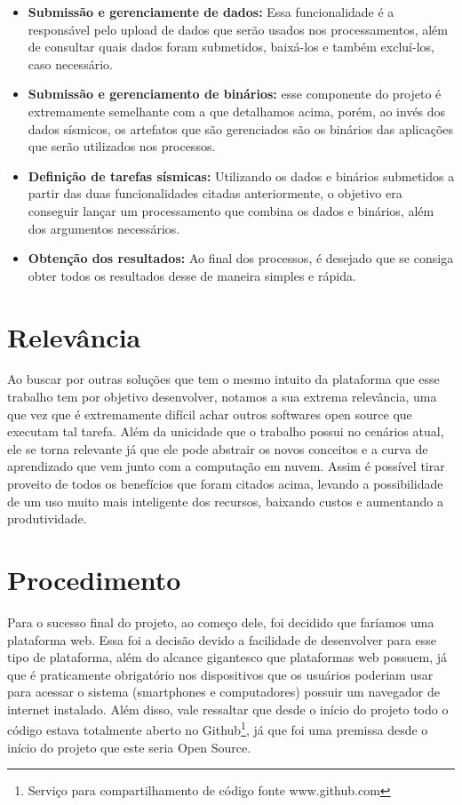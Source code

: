 \documentclass[11pt,twoside]{article}
\begin{document}
\begin{itemize}
  \item \textbf{Submissão e gerenciamente de dados:} Essa funcionalidade é a responsável pelo upload de dados que serão usados nos processamentos, além de consultar quais dados foram submetidos, baixá-los e também
  excluí-los, caso necessário. 
  \item \textbf{Submissão e gerenciamento de binários:} esse componente do projeto é extremamente semelhante com a que detalhamos acima, porém, ao invés dos dados sísmicos, os artefatos que são gerenciados são os 
  binários das aplicações que serão utilizados nos processos.
  \item \textbf{Definição de tarefas sísmicas:} Utilizando os dados e binários submetidos a partir das duas funcionalidades citadas anteriormente, o objetivo era conseguir lançar um processamento que combina os dados e 
  binários, além dos argumentos necessários.
  \item \textbf{Obtenção dos resultados:} Ao final dos processos, é desejado que se consiga obter todos os resultados desse de maneira simples e rápida.
\end{itemize}

\section{Relevância}
Ao buscar por outras soluções que tem o mesmo intuito da plataforma que esse trabalho tem por objetivo desenvolver, notamos a sua extrema relevância, uma que vez que é extremamente difícil achar outros softwares
open source que executam tal tarefa.
Além da unicidade que o trabalho possui no cenários atual, ele se torna relevante já que ele pode abstrair os novos conceitos e a curva de aprendizado que vem junto com a computação em nuvem. Assim é possível
tirar proveito de todos os benefícios que foram citados acima, levando a possibilidade de um uso muito mais inteligente dos recursos, baixando custos e aumentando a produtividade.

\section{Procedimento}
Para o sucesso final do projeto, ao começo dele, foi decidido que faríamos uma plataforma web. Essa foi a decisão devido a facilidade de desenvolver para esse tipo de plataforma, além do alcance
gigantesco que plataformas web possuem, já que é praticamente obrigatório nos dispositivos que os usuários poderiam usar para acessar o sistema (smartphones e computadores) possuir um
navegador de internet instalado. Além disso, vale ressaltar que desde o início do projeto todo o código estava totalmente aberto no Github\footnote{Serviço para compartilhamento de código fonte www.github.com}, já que foi uma premissa desde o início do projeto que este
seria Open Source.
\end{document}
